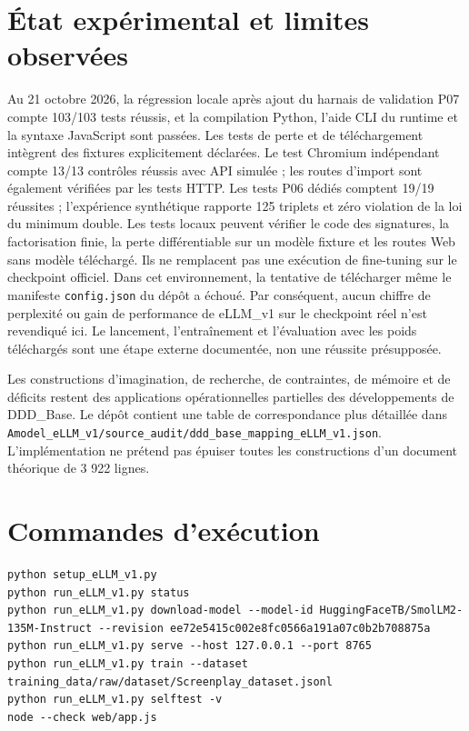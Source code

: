 \documentclass[11pt,a4paper]{article}
\begin{document}
\section{État expérimental et limites observées}
Au 21 octobre 2026, la régression locale après ajout du harnais de validation P07 compte 103/103 tests réussis, et la compilation Python, l'aide CLI du runtime et la syntaxe JavaScript sont passées. Les tests de perte et de téléchargement intègrent des fixtures explicitement déclarées. Le test Chromium indépendant compte 13/13 contrôles réussis avec API simulée ; les routes d’import sont également vérifiées par les tests HTTP. Les tests P06 dédiés comptent 19/19 réussites ; l'expérience synthétique rapporte 125 triplets et zéro violation de la loi du minimum double. Les tests locaux peuvent vérifier le code des signatures, la factorisation finie, la perte différentiable sur un modèle fixture et les routes Web sans modèle téléchargé. Ils ne remplacent pas une exécution de fine-tuning sur le checkpoint officiel. Dans cet environnement, la tentative de télécharger même le manifeste \texttt{config.json} du dépôt a échoué. Par conséquent, aucun chiffre de perplexité ou gain de performance de eLLM\_v1 sur le checkpoint réel n'est revendiqué ici. Le lancement, l'entraînement et l'évaluation avec les poids téléchargés sont une étape externe documentée, non une réussite présupposée.

Les constructions d'imagination, de recherche, de contraintes, de mémoire et de déficits restent des applications opérationnelles partielles des développements de DDD\_Base. Le dépôt contient une table de correspondance plus détaillée dans \texttt{Amodel\_eLLM\_v1/source\_audit/ddd\_base\_mapping\_eLLM\_v1.json}. L'implémentation ne prétend pas épuiser toutes les constructions d'un document théorique de 3 922 lignes.

\section{Commandes d'exécution}
\begin{lstlisting}[basicstyle=\ttfamily\small,breaklines=true]
python setup_eLLM_v1.py
python run_eLLM_v1.py status
python run_eLLM_v1.py download-model --model-id HuggingFaceTB/SmolLM2-135M-Instruct --revision ee72e5415c002e8fc0566a191a07c0b2b708875a
python run_eLLM_v1.py serve --host 127.0.0.1 --port 8765
python run_eLLM_v1.py train --dataset training_data/raw/dataset/Screenplay_dataset.jsonl
python run_eLLM_v1.py selftest -v
node --check web/app.js
\end{lstlisting}
\end{document}
